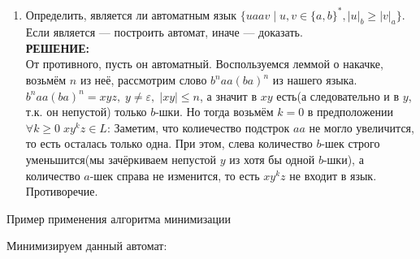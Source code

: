 \documentclass[12pt]{article}
\begin{document}
\begin{enumerate}
  \item Определить, является ли автоматным язык $\{ u a a v \mid u, v \in \{ a, b \}^* , |u|_b \geq |v|_a \}$. Если является --- построить автомат, иначе --- доказать.\\
\textbf{РЕШЕНИЕ:}\\
От противного, пусть он автоматный. Воспользуемся леммой о накачке, возьмём $n$ из неё, рассмотрим слово $b^naa(ba)^n$ из нашего языка. $b^naa(ba)^n = xyz, \;y \neq \varepsilon,\; |xy| \leq n$, а значит в $xy$ есть(а следовательно и в $y$, т.к. он непустой) только $b$-шки. Но тогда возьмём $k=0$ в предположении $\forall{k\geq 0} \; xy^kz \in L$: Заметим, что колиечество подстрок $aa$ не могло увеличится, то есть осталась только одна. При этом, слева количество $b$-шек строго уменьшится(мы зачёркиваем непустой $y$ из хотя бы одной $b$-шки), а количество $a$-шек справа не изменится, то есть $xy^kz$ не входит в язык. Противоречие.
\end{enumerate}

\newpage

\begin{center}
  \Large{Пример применения алгоритма минимизации}
\end{center}

\bigskip

Минимизируем данный автомат:

\begin{center}
\end{center}
\end{document}
